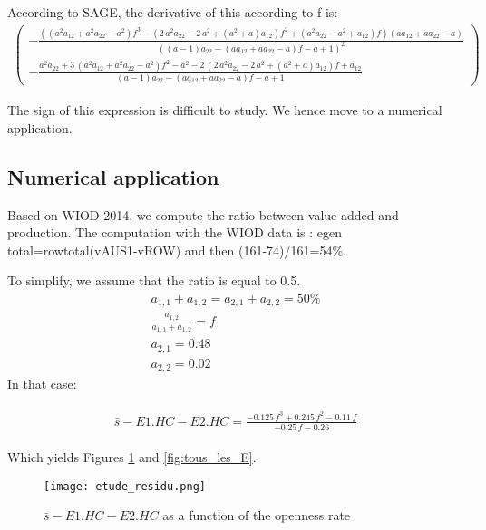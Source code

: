 \documentclass[11pt,a4paper]{article}
\begin{document}
According to SAGE, the derivative of this according to f is: 
\begin{gather*}
\left(\begin{array}{r}
-\frac{{\left({\left(a^{2} a_{12} + a^{2} a_{22} - a^{2}\right)} f^{3} - {\left(2 \, a^{2} a_{22} - 2 \, a^{2} + {\left(a^{2} + a\right)} a_{12}\right)} f^{2} + {\left(a^{2} a_{22} - a^{2} + a_{12}\right)} f\right)} {\left(a a_{12} + a a_{22} - a\right)}}{{\left({\left(a - 1\right)} a_{22} - {\left(a a_{12} + a a_{22} - a\right)} f - a + 1\right)}^{2}} \\
- \frac{a^{2} a_{22} + 3 \, {\left(a^{2} a_{12} + a^{2} a_{22} - a^{2}\right)} f^{2} - a^{2} - 2 \, {\left(2 \, a^{2} a_{22} - 2 \, a^{2} + {\left(a^{2} + a\right)} a_{12}\right)} f + a_{12}}{{\left(a - 1\right)} a_{22} - {\left(a a_{12} + a a_{22} - a\right)} f - a + 1}
\end{array}\right)
\end{gather*}

The sign of this expression is difficult to study. We hence move to a numerical application.

\subsection{Numerical application}
Based on WIOD 2014, we compute the ratio between value added and production. The computation with the WIOD data is : 
egen total=rowtotal(vAUS1-vROW) and then (161-74)/161=54\%.

To simplify, we assume that the ratio is equal to 0.5.
\begin{gather*}
a_{1,1}+a_{1,2}=a_{2,1}+a_{2,2}=50\% \\
\frac{a_{1,2}}{a_{1,1}+a_{1,2}}=f \\
a_{2,1}=0.48 \\
a_{2,2}=0.02
\end{gather*}
In that case:

\begin{gather*}
\begin{array}{r}
\bar{s}-E1.HC-E2.HC = \frac{-0.125 \, f^{3} + 0.245 \, f^{2} - 0.11 \, f}{-0.25 \, f - 0.26
}
\end{array}
\end{gather*}

Which yields Figures \ref{fig:resid} and \ref{fig:tous_les_E}.
\begin{figure}[!h]
	\begin{center}
		\texttt{[image: etude\_residu.png]}
		\caption{$\bar{s}-E1.HC-E2.HC$ as a function of the openness rate}
		\label{fig:resid}
	\end{center}
\end{figure}
\end{document}

